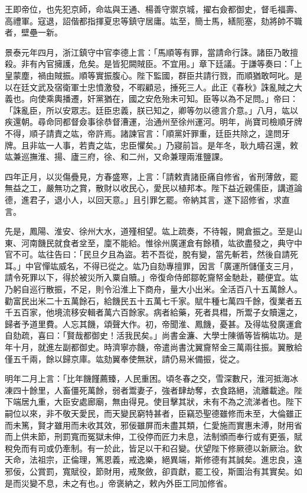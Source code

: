 \begin{pinyinscope}
王即帝位，也先犯京師，命竑與王通、楊善守禦京城，擢右僉都御史，督毛福壽、高禮軍。寇退，詔偕都指揮夏忠等鎮守居庸。竑至，簡士馬，繕阨塞，劾將帥不職者，壁壘一新。

景泰元年四月，浙江鎮守中官李德上言：「馬順等有罪，當請命行誅。諸臣乃敢擅殺。非有內官擁護，危矣。是皆犯闕賊臣。不宜用。」章下廷議。于謙等奏曰：「上皇蒙塵，禍由賊振。順等實振腹心。陛下監國，群臣共請行戮，而順猶敢呵叱。是以在廷文武及宿衛軍士忠憤激發，不暇顧忌，捶死三人。此正《春秋》誅亂賊之大義也。向使乘輿播遷，奸黨猶在，國之安危殆未可知。臣等以為不足問。」帝曰：「誅亂臣，所以安眾志。廷臣忠義，朕已知之，卿等勿以德言介意。」八月，竑以疾還朝。尋命同都督僉事徐恭督漕運，治通州至徐州運河。明年，尚寶司檢順牙牌不得，順子請責之竑，帝許焉。諸諫官言：「順黨奸罪重，廷臣共除之，遑問牙牌。且非竑一人事，若責之竑，忠臣懼矣。」乃寢前旨。是年冬，耿九疇召還，敕竑兼巡撫淮、揚、廬三府，徐、和二州，又命兼理兩淮鹽課。

四年正月，以災傷疊見，方春盛寒，上言：「請敕責諸臣痛自修省，省刑薄斂，罷無益之工，嚴無功之賞，散財以收民心，愛民以植邦本。陛下益近親儒臣，講道論德，進君子，退小人，以回天意。」且引罪乞罷。帝納其言，遂下詔修省，求直言。

先是，鳳陽、淮安、徐州大水，道殣相望。竑上疏奏，不待報，開倉振之。至是山東、河南饑民就食者坌至，廩不能給。惟徐州廣運倉有餘積，竑欲盡發之，典守中官不可。竑往告曰：「民旦夕且為盜。若不吾從，脫有變，當先斬若，然後自請死耳。」中官憚竑威名，不得已從之。竑乃自劾專擅罪，因言「廣運所儲僅支三月，請令死罪以下，得於被災所入粟自贖。」帝復命侍郎鄒乾齎帑金馳赴，聽便宜。竑乃躬自巡行散振，不足，則令沿淮上下商舟，量大小出米。全活百八十五萬餘人。勸富民出米二十五萬餘石，給饑民五十五萬七千家。賦牛種七萬四千餘，復業者五千五百家，他境流移安輯者萬六百餘家。病者給藥，死者具槥，所鬻子女贖還之，歸者予道里費。人忘其饑，頌聲大作。初，帝聞淮、鳳饑，憂甚。及得竑發廣運倉自劾疏，喜曰：「賢哉都御史！活我民矣。」尚書金濂、大學士陳循等皆稱竑功。是年十月，就進左副都御史。時濟寧亦饑，帝遣尚書沈翼齎帑金三萬兩往振。翼散給僅五千兩，餘以歸京庫。竑劾翼奉使無狀，請仍易米備振，從之。

明年二月上言：「比年饑饉薦臻，人民重困。頃冬春之交，雪深數尺，淮河抵海冰凍四十餘里，人畜僵死萬餘，弱者鬻妻子，強者肆劫奪，衣食路絕，流離載途。陛下端居九重，大臣安處廊廟，無由得見。使目擊其狀，未有不為之流涕者也。陛下嗣位以來，非不敬天愛民，而天變民窮特甚者，臣竊恐聖德雖修而未至，大倫雖正而未篤，賢才雖用而未收其效，邪佞雖屏而未盡其類，仁愛施而實惠未溥，財用省而上供未節，刑罰寬而冤獄未伸，工役停而匠力未息，法制頒而奉行或有更張，賦稅免而有司或仍牽制。有一於此，皆足以干和召變。伏望陛下修厥德以新厥治。欽天命，法祖宗，正倫理，篤恩義，戒逸樂，絕異端，斯修德有其誠矣。進忠良，遠邪佞，公賞罰，寬賦役，節財用，戒聚斂，卻貢獻，罷工役，斯圖治有其實矣。如是而災變不息，未之有也。」帝褒納之，敕內外臣工同加修省。


\end{pinyinscope}
